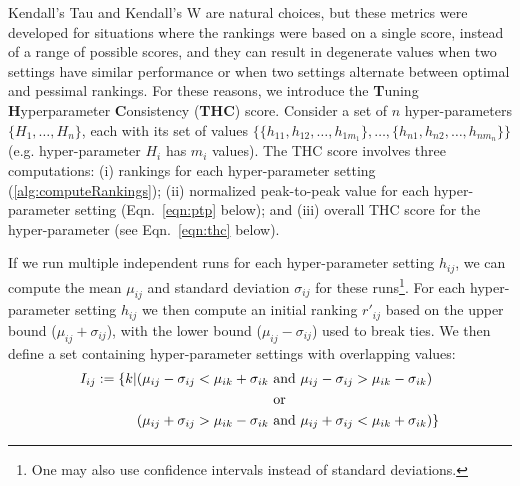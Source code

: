 Kendall's Tau \citep{kendall38measure} and Kendall's W \citep{10.1214/aoms/1177732186} are natural choices, but these metrics were developed for situations where the rankings were based on a single score, instead of a range of possible scores, and they can result in degenerate values when two settings have similar performance or when two settings alternate between optimal and pessimal rankings. For these reasons, we introduce the \textbf{T}uning \textbf{H}yperparameter \textbf{C}onsistency ({\bf THC}) score. Consider a set of $n$ hyper-parameters $\lbrace H_1,\ldots,H_n\rbrace$, each with its set of values $\lbrace\lbrace h_{11},h_{12},\ldots,h_{1m_1}\rbrace, \ldots,\lbrace h_{n1},h_{n2},\ldots,h_{nm_n}\rbrace\rbrace$ (e.g. hyper-parameter $H_i$ has $m_i$ values). The THC score involves three computations: (i) rankings for each hyper-parameter setting (\autoref{alg:computeRankings}); (ii) normalized peak-to-peak value for each hyper-parameter setting (Eqn.~\ref{eqn:ptp} below); and (iii) overall THC score for the hyper-parameter (see Eqn.~\ref{eqn:thc} below).

If we run multiple independent runs for each hyper-parameter setting $h_{ij}$, we can compute the mean $\mu_{ij}$ and standard deviation $\sigma_{ij}$ for these runs\footnote{One may also use confidence intervals instead of standard deviations.}. For each hyper-parameter setting $h_{ij}$ we then compute an initial ranking $r'_{ij}$ based on the upper bound ($\mu_{ij}+\sigma_{ij}$), with the lower bound ($\mu_{ij}-\sigma_{ij}$) used to break ties. We then define a set containing hyper-parameter settings with overlapping values:
\begin{align*}
    I_{ij} := \{k \vert (\mu_{ij} - \sigma_{ij} < \mu_{ik} + \sigma_{ik} &\text{ and } \mu_{ij} - \sigma_{ij} > \mu_{ik} - \sigma_{ik}) \\ &\text{ or } \\ \break (\mu_{ij} + \sigma_{ij} > \mu_{ik} - \sigma_{ik} &\text{ and } \mu_{ij} + \sigma_{ij} < \mu_{ik} + \sigma_{ik}) \}
\end{align*}




